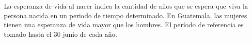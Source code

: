La esperanza de vida al nacer indica la cantidad de años que se espera que viva la persona nacida en un periodo de tiempo determinado. En Guatemala, las mujeres tienen una esperanza de vida mayor que los hombres. El período de referencia es tomado hasta el 30 junio de cada año. 